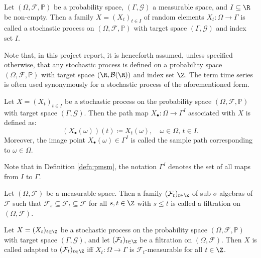 \begin{defn}
Let $(\Omega,\mathcal{F},\mathbb{P})$ be a probability space, $(\Gamma,\mathcal{G})$ a measurable space, and $I\subseteq\R$ be non-empty. Then a family $X=(X_{t})_{t\in I}$ of random elements $X_{t}:\Omega\to\Gamma$ is called a stochastic process on $(\Omega,\mathcal{F},\mathbb{P})$ with target space $(\Gamma,\mathcal{G})$ and index set $I$. %
\end{defn}
Note that, in this project report, it is henceforth assumed, unless specified otherwise, that any stochastic process is defined on a probability space $(\Omega,\mathcal{F},\mathbb{P})$  with target space $(\R,\mathcal{B}(\R))$ and index set $\Z$. The term time series is often used synonymously for a stochastic process of the aforementioned form.
\begin{defn}\label{defn:pmsm}
Let $X=(X_{t})_{t\in I}$ be a stochastic process on the probability space $(\Omega,\mathcal{F},\mathbb{P})$ with target space $(\Gamma,\mathcal{G})$. Then the path map $X_{\bullet}:\Omega\to\Gamma^{I}$ associated with $X$ is defined as:
\begin{equation}
    (X_{\bullet}(\omega))(t)\coloneqq X_{t}(\omega),\quad\omega\in\Omega,\, t\in I.
\end{equation}
Moreover, the image point $X_{\bullet}(\omega)\in\Gamma^{I}$ is called the sample path corresponding to $\omega\in\Omega$.
\end{defn}
Note that in Definition \ref{defn:pmsm}, the notation $\Gamma^{I}$ denotes the set of all maps from $I$ to $\Gamma$.
\begin{defn}
Let $(\Omega,\mathcal{F})$ be a measurable space. Then a family $(\mathcal{F}_{t})_{t\in\Z}$ of sub-$\sigma$-algebras of $\mathcal{F}$ such that $\mathcal{F}_{s}\subseteq\mathcal{F}_{t}\subseteq\mathcal{F}$ for all $s,t\in\Z$ with $s\leq t$ is called a filtration on $(\Omega,\mathcal{F})$. 
\end{defn}
\begin{defn}
Let $X=(X_{t})_{t\in\Z}$ be a stochastic process on the probability space $(\Omega,\mathcal{F},\mathbb{P})$ with target space $(\Gamma,\mathcal{G})$, and let $(\mathcal{F}_{t})_{t\in\Z}$ be a filtration on $(\Omega,\mathcal{F})$. Then $X$ is called adapted to $(\mathcal{F}_{t})_{t\in\Z}$ iff $X_{t}:\Omega\to\Gamma$ is $\mathcal{F}_{t}$-measurable for all $t\in\Z$.
\end{defn}
